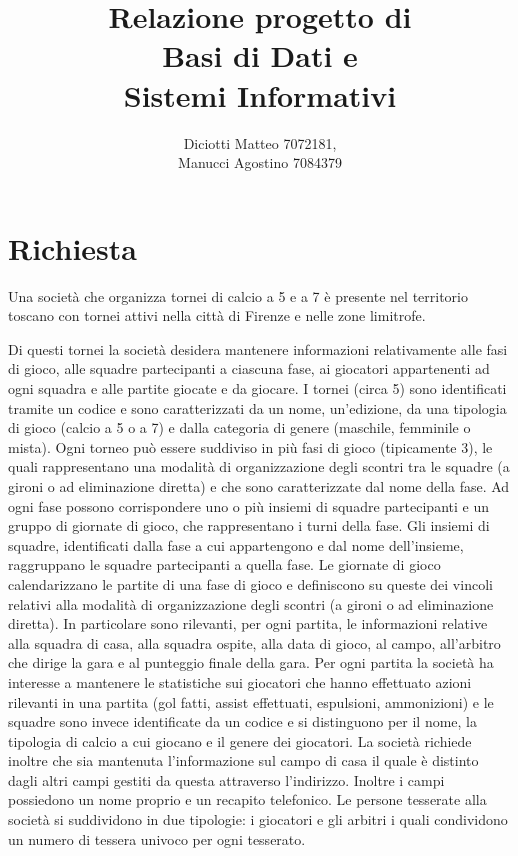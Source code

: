 \documentclass[12pt, openany]{article}
\title{Relazione progetto di \\\textbf{Basi di Dati e\\ Sistemi Informativi}}
\author{Diciotti Matteo 7072181,\\Manucci Agostino 7084379}
\date{}
\theoremstyle{definition}
\theoremstyle{plain}
\theoremstyle{remark}
\begin{document}
	\maketitle
	\tableofcontents
	\newpage

	\part{Richiesta}
		Una società che organizza tornei di calcio a 5 e a 7 \`e presente nel territorio toscano con tornei attivi nella città di Firenze e nelle zone limitrofe.

		Di questi tornei la società desidera mantenere informazioni relativamente alle fasi di gioco, alle squadre partecipanti a ciascuna fase, ai giocatori appartenenti ad ogni squadra e alle partite giocate e da giocare.
		I tornei (circa 5) sono identificati tramite un codice e sono caratterizzati da un nome, un'edizione, da una tipologia di gioco (calcio a 5 o a 7) e dalla categoria di genere (maschile, femminile o mista).
		Ogni torneo può essere suddiviso in più fasi di gioco (tipicamente 3), le quali rappresentano una modalità di organizzazione degli scontri tra le squadre (a gironi o ad eliminazione diretta) e che sono caratterizzate dal nome della fase.
		Ad ogni fase possono corrispondere uno o più insiemi di squadre partecipanti e un gruppo di giornate di gioco, che rappresentano i turni della fase.
		Gli insiemi di squadre, identificati dalla fase a cui appartengono e dal nome dell'insieme, raggruppano le squadre partecipanti a quella fase.
		Le giornate di gioco calendarizzano le partite di una fase di gioco e definiscono su queste dei vincoli relativi alla modalità di organizzazione degli scontri (a gironi o ad eliminazione diretta).
		In particolare sono rilevanti, per ogni partita, le informazioni relative alla squadra di casa, alla squadra ospite, alla data di gioco, al campo, all'arbitro che dirige la gara e al punteggio finale della gara.
		Per ogni partita la società ha interesse a mantenere le statistiche sui giocatori che hanno effettuato azioni rilevanti in una partita (gol fatti, assist effettuati, espulsioni, ammonizioni) e le squadre sono invece identificate da un codice e si distinguono per il nome, la tipologia di calcio a cui giocano e il genere dei giocatori.
		La società richiede inoltre che sia mantenuta l'informazione sul campo di casa il quale \`e distinto dagli altri campi gestiti da questa attraverso l'indirizzo. Inoltre i campi possiedono un nome proprio e un recapito telefonico.
		Le persone tesserate alla società si suddividono in due tipologie: i giocatori e gli arbitri i quali condividono un numero di tessera univoco per ogni tesserato.
		
\end{document}
